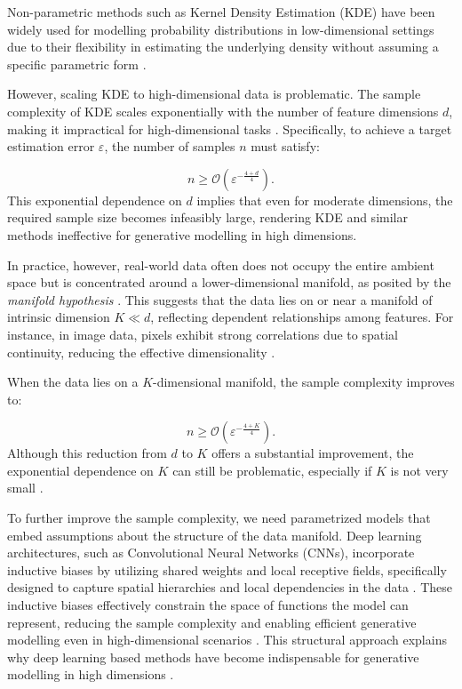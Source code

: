 Non-parametric methods such as Kernel Density Estimation (KDE) have been widely used for modelling probability distributions in low-dimensional settings due to their flexibility in estimating the underlying density without assuming a specific parametric form \cite{silverman1986density}.

However, scaling KDE to high-dimensional data is problematic. The sample complexity of KDE scales exponentially with the number of feature dimensions \( d \), making it impractical for high-dimensional tasks \cite{wasserman2006all}. Specifically, to achieve a target estimation error \( \varepsilon \), the number of samples \( n \) must satisfy:

\[
n \geq \mathcal{O}\left(\varepsilon^{-\frac{4 + d}{4}}\right).
\]
\cite{scott2015multivariate}
This exponential dependence on \( d \) implies that even for moderate dimensions, the required sample size becomes infeasibly large, rendering KDE and similar methods ineffective for generative modelling in high dimensions.

In practice, however, real-world data often does not occupy the entire ambient space but is concentrated around a lower-dimensional manifold, as posited by the \emph{manifold hypothesis} \cite{fefferman2016testing}. This suggests that the data lies on or near a manifold of intrinsic dimension \( K \ll d \), reflecting dependent relationships among features. For instance, in image data, pixels exhibit strong correlations due to spatial continuity, reducing the effective dimensionality \cite{roweis2000nonlinear}.

When the data lies on a \( K \)-dimensional manifold, the sample complexity improves to:

\[
n \geq \mathcal{O}\left(\varepsilon^{-\frac{4 + K}{4}}\right).
\]
\cite{bickel2007local}
Although this reduction from \( d \) to \( K \) offers a substantial improvement, the exponential dependence on \( K \) can still be problematic, especially if \( K \) is not very small \cite{cayton2005algorithms}.

To further improve the sample complexity, we need parametrized models that embed assumptions about the structure of the data manifold. Deep learning architectures, such as Convolutional Neural Networks (CNNs), incorporate inductive biases by utilizing shared weights and local receptive fields, specifically designed to capture spatial hierarchies and local dependencies in the data \cite{lecun1998gradient}. These inductive biases effectively constrain the space of functions the model can represent, reducing the sample complexity and enabling efficient generative modelling even in high-dimensional scenarios \cite{poggio2017theory}. This structural approach explains why deep learning based methods have become indispensable for generative modelling in high dimensions \cite{goodfellow2016deep, kingma2013auto}.

